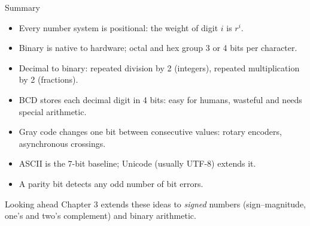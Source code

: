 \documentclass[9pt,aspectratio=169,xcolor=table]{beamer}
\begin{document}
\begin{frame}{Summary}
  \begin{itemize}\itemsep3pt\small
    \item Every number system is positional: the weight of digit $i$ is $r^i$.
    \item Binary is native to hardware; octal and hex group 3 or 4 bits per character.
    \item Decimal to binary: repeated division by 2 (integers), repeated multiplication by 2 (fractions).
    \item \alert{BCD} stores each decimal digit in 4 bits: easy for humans, wasteful and needs special arithmetic.
    \item \alert{Gray code} changes one bit between consecutive values: rotary encoders, asynchronous crossings.
    \item \alert{ASCII} is the 7-bit baseline; Unicode (usually UTF-8) extends it.
    \item A parity bit detects any odd number of bit errors.
  \end{itemize}
  \begin{block}{Looking ahead}
    Chapter 3 extends these ideas to \emph{signed} numbers (sign--magnitude, one's and two's complement) and binary arithmetic.
  \end{block}
\end{frame}
\end{document}
